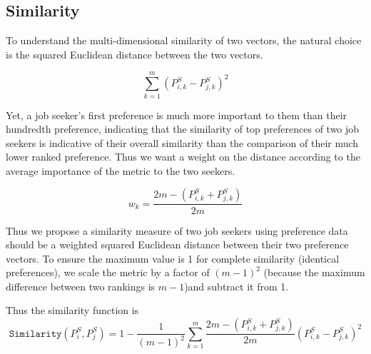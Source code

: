 \subsection{Similarity}

To understand the multi-dimensional similarity of two vectors, the natural choice is the squared Euclidean distance between the two vectors. 

\[\sum_{k=1}^{m} (P^S_{i,k} - P^S_{j,k})^2\]

Yet, a job seeker's first preference is much more important to them than their hundredth preference, indicating that the similarity of top preferences of two job seekers is indicative of their overall similarity than the comparison of their much lower ranked preference.  Thus we want a weight on the distance according to the average importance of the metric to the two seekers.

\[w_k = \frac{2m - (P^S_{i,k} + P^S_{j,k})}{2m}\]


Thus we propose a similarity measure of two job seekers using preference data should be a weighted squared Euclidean distance between their two preference vectors. To ensure the maximum value is 1 for complete similarity (identical preferences), we scale the metric by a factor of $(m-1)^2$ (because the maximum difference between two rankings is $m-1$)and subtract it from 1.

Thus the similarity function is
\[\texttt{Similarity}(P^S_i, P^S_j) = 1 - \frac{1}{(m-1)^2}\sum_{k=1}^{m} \frac{2m - (P^S_{i,k} + P^S_{j,k})}{2m}(P^S_{i,k} - P^S_{j,k})^2\]